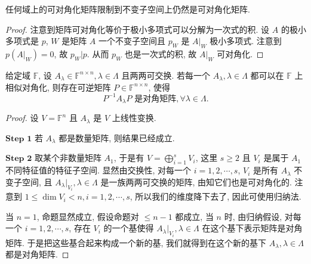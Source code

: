 \documentclass[../../main.tex]{subfiles}%
\begin{document}
\begin{lemma}\label{lemma:可对角化矩阵限制后仍可对角化}
任何域上的可对角化矩阵限制到不变子空间上仍然是可对角化矩阵.
\end{lemma}
\begin{proof}

注意到矩阵可对角化等价于极小多项式可以分解为一次式的积. 设 \( A \) 的极小多项式是 \( p \), \( W \) 是矩阵 \( A \) 一个不变子空间且 \( p_W \) 是 \( A|_W \) 极小多项式. 注意到 \( p(A|_W) = 0 \), 故 \( p_W | p \). 从而 \( p_W \) 也是一次式的积, 故 \( A|_W \) 可对角化.

\end{proof}

\begin{proposition}[一族两两可交换的可对角化矩阵可同时相似对角化]\label{proposition:一族两两可交换的可对角化矩阵可同时相似对角化}
给定域 \( \mathbb{F} \), 设 \( A_\lambda \in \mathbb{F}^{n \times n}, \lambda \in \Lambda \) 且两两可交换. 若每一个 \( A_\lambda, \lambda \in \Lambda \) 都可以在 \( \mathbb{F} \) 上相似对角化, 则存在可逆矩阵 \( P \in \mathbb{F}^{n \times n} \), 使得
\[
P^{-1}A_\lambda P \text{ 是对角矩阵}, \forall \lambda \in \Lambda.
\]
\end{proposition}
\begin{proof}

设 \( V = \mathbb{F}^n \) 且 \( A_\lambda \) 是 \( V \) 上线性变换.

$\mathbf{Step}\,\,\mathbf{1}$  若 \( A_\lambda \) 都是数量矩阵, 则结果已经成立.

$\mathbf{Step}\,\,\mathbf{2}$  取某个非数量矩阵 \( A_1 \), 于是有 \( V = \bigoplus_{i=1}^s V_i \), 这里 \( s \geqslant  2 \) 且 \( V_i \) 是属于 \( A_1 \) 不同特征值的特征子空间. 显然由交换性, 对每一个 \( i = 1,2,\cdots,s \), \( V_i \) 是所有 \( A_\lambda \) 不变子空间, 且 \( A_\lambda|_{V_i}, \lambda \in \Lambda \) 是一族两两可交换的矩阵, 由知它们也是可对角化的. 注意到 \( 1 \leqslant  \dim V_i < n, i = 1,2,\cdots,s \), 所以我们的维度降下去了, 因此可使用归纳法.

当 \( n = 1 \), 命题显然成立, 假设命题对 \( \leqslant  n - 1 \) 都成立, 当 \( n \) 时, 由归纳假设, 对每一个 \( i = 1,2,\cdots,s \), 存在 \( V_i \) 的一个基使得 \( A_\lambda|_{V_i}, \lambda \in \Lambda \) 在这个基下表示矩阵是对角矩阵. 于是把这些基合起来构成一个新的基, 我们就得到在这个新的基下 \( A_\lambda, \lambda \in \Lambda \) 都是对角矩阵.

\end{proof}
\end{document}
